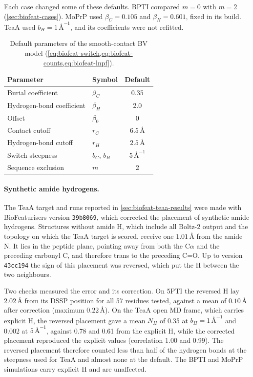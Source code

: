 Each case changed some of these defaults. BPTI compared $m=0$ with $m=2$ (\cref{sec:biofeat-cases}). MoPrP used $\beta_C=0.105$ and $\beta_H=0.601$, fixed in its build. TeaA used $b_H=1\,\text{\AA}^{-1}$, and its coefficients were not refitted.

\begin{table}[htbp]
    \centering
    \small
    \begin{tabular}{@{}llc@{}}
    \toprule
        \textbf{Parameter} & \textbf{Symbol} & \textbf{Default} \\
    \midrule
        Burial coefficient & $\beta_C$ & 0.35 \\
        Hydrogen-bond coefficient & $\beta_H$ & 2.0 \\
        Offset & $\beta_0$ & 0 \\
        Contact cutoff & $r_C$ & $6.5\,\text{\AA}$ \\
        Hydrogen-bond cutoff & $r_H$ & $2.5\,\text{\AA}$ \\
        Switch steepness & $b_C$, $b_H$ & $5\,\text{\AA}^{-1}$ \\
        Sequence exclusion & $m$ & 2 \\
    \bottomrule
    \end{tabular}
    \caption{Default parameters of the smooth-contact BV model (\cref{eq:biofeat-switch,eq:biofeat-counts,eq:biofeat-lnpf}).}
    \label{tab:biofeat-bv-defaults}
\end{table}

\paragraph{Synthetic amide hydrogens.}
The TeaA target and runs reported in \cref{sec:biofeat-teaa-results} were made with BioFeaturisers version \texttt{39b8069}, which corrected the placement of synthetic amide hydrogens. Structures without amide H, which include all Boltz-2 output and the topology on which the TeaA target is scored, receive one $1.01\,\text{\AA}$ from the amide N. It lies in the peptide plane, pointing away from both the C$\alpha$ and the preceding carbonyl C, and therefore trans to the preceding C=O. Up to version \texttt{43cc194} the sign of this placement was reversed, which put the H between the two neighbours.

Two checks measured the error and its correction. On 5PTI the reversed H lay $2.02\,\text{\AA}$ from its DSSP position for all 57 residues tested, against a mean of $0.10\,\text{\AA}$ after correction (maximum $0.22\,\text{\AA}$). On the TeaA open MD frame, which carries explicit H, the reversed placement gave a mean $N_H$ of 0.35 at $b_H=1\,\text{\AA}^{-1}$ and 0.002 at $5\,\text{\AA}^{-1}$, against 0.78 and 0.61 from the explicit H, while the corrected placement reproduced the explicit values (correlation 1.00 and 0.99). The reversed placement therefore counted less than half of the hydrogen bonds at the steepness used for TeaA and almost none at the default. The BPTI and MoPrP simulations carry explicit H and are unaffected.

